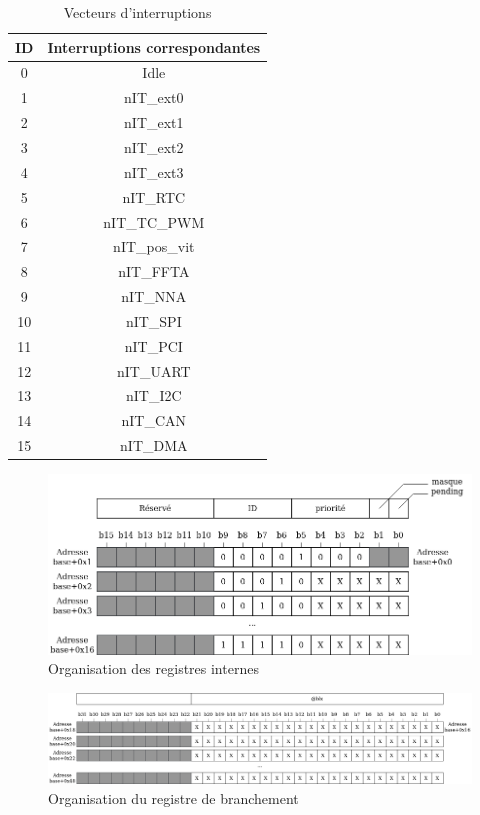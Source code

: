 \begin{table}[H]
	\centering
	\begin{tabular}{|c|c|}
		\hline
		ID & Interruptions correspondantes \\
		\hline
		0 & Idle\\
		\hline
		1 & nIT\_ext0\\
		\hline
		2 & nIT\_ext1\\
		\hline
		3 & nIT\_ext2\\
		\hline
		4 & nIT\_ext3\\
		\hline
		5 & nIT\_RTC\\
		\hline
		6 & nIT\_TC\_PWM\\
		\hline
		7 & nIT\_pos\_vit\\
		\hline
		8 & nIT\_FFTA\\
		\hline
		9 & nIT\_NNA\\
		\hline
		10 & nIT\_SPI\\
		\hline
		11 & nIT\_PCI\\
		\hline
		12 & nIT\_UART\\
		\hline
		13 & nIT\_I2C\\
		\hline
		14 & nIT\_CAN\\
		\hline
		15 & nIT\_DMA\\
		\hline
	\end{tabular}
	\caption{Vecteurs d'interruptions}
	\label{tab:vec_int}
\end{table}

\begin{figure}[H]
	\centering
	\includegraphics[width=1\linewidth]{figure/plan_registres.png}
	\caption{Organisation des registres internes}
	\label{fig:plan_registres}
\end{figure} 

\begin{figure}[H]
	\centering
	\includegraphics[width=1\linewidth]{figure/plan_branchement.png}
	\caption{Organisation du registre de branchement}
	\label{fig:plan_branchement}
\end{figure} 

